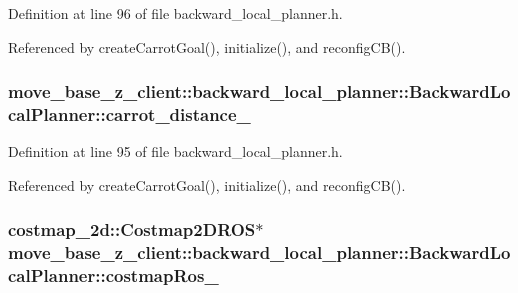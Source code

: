 Definition at line 96 of file backward\+\_\+local\+\_\+planner.\+h.



Referenced by create\+Carrot\+Goal(), initialize(), and reconfig\+C\+B().

\subsubsection[{\texorpdfstring{carrot\+\_\+distance\+\_\+}{carrot_distance_}}]{ move\+\_\+base\+\_\+z\+\_\+client\+::backward\+\_\+local\+\_\+planner\+::\+Backward\+Local\+Planner\+::carrot\+\_\+distance\+\_\+\hspace{0.3cm}{\ttfamily [private]}}\hypertarget{classmove__base__z__client_1_1backward__local__planner_1_1BackwardLocalPlanner_a6dc3aa0ff63f9f7d0aae852755734b5d}{}\label{classmove__base__z__client_1_1backward__local__planner_1_1BackwardLocalPlanner_a6dc3aa0ff63f9f7d0aae852755734b5d}


Definition at line 95 of file backward\+\_\+local\+\_\+planner.\+h.



Referenced by create\+Carrot\+Goal(), initialize(), and reconfig\+C\+B().

\subsubsection[{\texorpdfstring{costmap\+Ros\+\_\+}{costmapRos_}}]{\setlength{\rightskip}{0pt plus 5cm}costmap\+\_\+2d\+::\+Costmap2\+D\+R\+OS$\ast$ move\+\_\+base\+\_\+z\+\_\+client\+::backward\+\_\+local\+\_\+planner\+::\+Backward\+Local\+Planner\+::costmap\+Ros\+\_\+\hspace{0.3cm}{\ttfamily [private]}}\hypertarget{classmove__base__z__client_1_1backward__local__planner_1_1BackwardLocalPlanner_a865618f84238fe6ff437d1e38ec5fec0}{}\label{classmove__base__z__client_1_1backward__local__planner_1_1BackwardLocalPlanner_a865618f84238fe6ff437d1e38ec5fec0}


